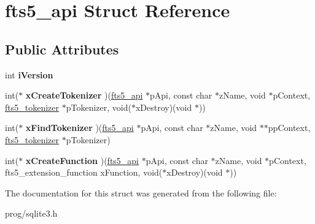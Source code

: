 \hypertarget{structfts5__api}{}\section{fts5\+\_\+api Struct Reference}
\label{structfts5__api}
\subsection*{Public Attributes}
\begin{DoxyCompactItemize}
\item 
\mbox{\label{structfts5__api_a3c338289abb33e1805da870172956a7c}} 
int {\bfseries i\+Version}
\item 
\mbox{\label{structfts5__api_a7fe3663f85eab512d5c461e1674da129}} 
int($\ast$ {\bfseries x\+Create\+Tokenizer} )(\mbox{\hyperlink{structfts5__api}{fts5\+\_\+api}} $\ast$p\+Api, const char $\ast$z\+Name, void $\ast$p\+Context, \mbox{\hyperlink{structfts5__tokenizer}{fts5\+\_\+tokenizer}} $\ast$p\+Tokenizer, void($\ast$x\+Destroy)(void $\ast$))
\item 
\mbox{\label{structfts5__api_a20a23794695fa61e2892ad1243b16b67}} 
int($\ast$ {\bfseries x\+Find\+Tokenizer} )(\mbox{\hyperlink{structfts5__api}{fts5\+\_\+api}} $\ast$p\+Api, const char $\ast$z\+Name, void $\ast$$\ast$pp\+Context, \mbox{\hyperlink{structfts5__tokenizer}{fts5\+\_\+tokenizer}} $\ast$p\+Tokenizer)
\item 
\mbox{\label{structfts5__api_acf1a0612be3b91b908f38ecbc6735d17}} 
int($\ast$ {\bfseries x\+Create\+Function} )(\mbox{\hyperlink{structfts5__api}{fts5\+\_\+api}} $\ast$p\+Api, const char $\ast$z\+Name, void $\ast$p\+Context, fts5\+\_\+extension\+\_\+function x\+Function, void($\ast$x\+Destroy)(void $\ast$))
\end{DoxyCompactItemize}


The documentation for this struct was generated from the following file\+:\begin{DoxyCompactItemize}
\item 
prog/sqlite3.\+h\end{DoxyCompactItemize}
